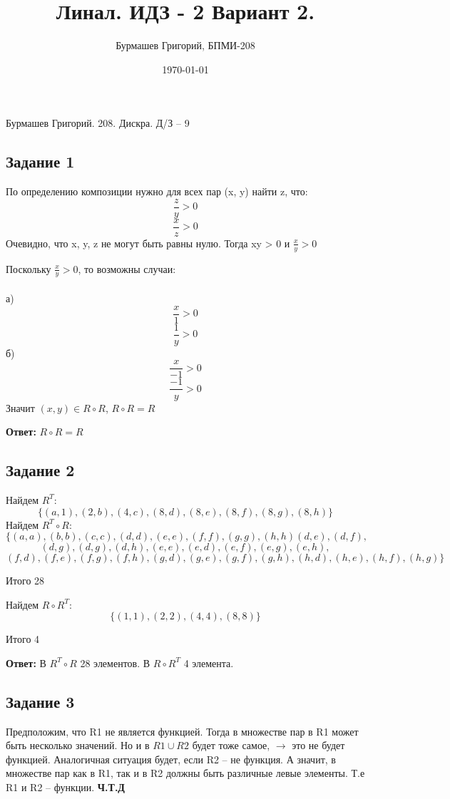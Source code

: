 \documentclass[a4paper,12pt]{article}
\author{Бурмашев Григорий, БПМИ-208}
\title{Линал. ИДЗ - 2 Вариант 2.}
\date{\today}
\begin{document}
\begin{center}
Бурмашев Григорий.  208. Дискра. Д/З -- 9
\end{center}
\newpage
\subsection*{Задание 1}
По определению композиции нужно для всех пар (x, y) найти z,  что:
\[
\frac{z}{y} > 0
\]
\[
\frac{x}{z} > 0
\]
Очевидно, что x, y, z не могут быть равны нулю. Тогда xy > 0 и $\frac{x}{y} > 0$

Поскольку $\frac{x}{y} > 0$,  то возможны случаи:
\\\\
а)
\[
\frac{x}{1} > 0
\]
\[
\frac{1}{y} > 0
\]
б)
\[
\frac{x}{-1} > 0
\]
\[
\frac{-1}{y} > 0
\]
Значит $ (x, y) \in R \circ R $, $R \circ R = R$
\begin{center}
\textbf{Ответ:} $R \circ R = R$
\end{center}

\subsection*{Задание 2}
Найдем $R^T$:
\[
\{   (a, 1), (2, b), (4, c), (8,  d), (8, e), (8, f), (8, g), (8, h) \}
\]
Найдем $R^T \circ R:$
\[
\{  
(a, a), (b, b), (c, c), (d, d), (e, e), (f, f), (g, g), (h, h) (d, e), (d, f),
\]
\[
 (d, g), (d, g), (d, h), (e, e), (e, d), (e, f), (e, g), (e, h), \]
\[(f, d), (f, e), (f, g), (f, h), (g, d), (g, e), (g, f), (g, h), (h, d), (h, e), (h, f), (h, g)
\}
\]
\begin{center}
Итого 28
\end{center}
Найдем $R \circ R^T$:
\[
\{ (1, 1), (2, 2), (4, 4), (8, 8)\}
\]
\begin{center}
Итого 4
\end{center}
\begin{center}
\textbf{Ответ:} В $R^T \circ R$ 28 элементов. В $R \circ R^T$ 4 элемента.
\end{center}

\subsection*{Задание 3}
Предположим, что  R1 не является функцией. Тогда в множестве пар в R1  может быть несколько значений. Но и в $R1 \cup R2$ будет тоже самое, $\rightarrow$ это не будет функцией. Аналогичная ситуация будет, если R2 -- не функция. А значит, в множестве пар как в R1, так и в R2 должны быть различные левые элементы. Т.е R1 и R2 --  функции. \textbf{Ч.Т.Д}
\end{document}
